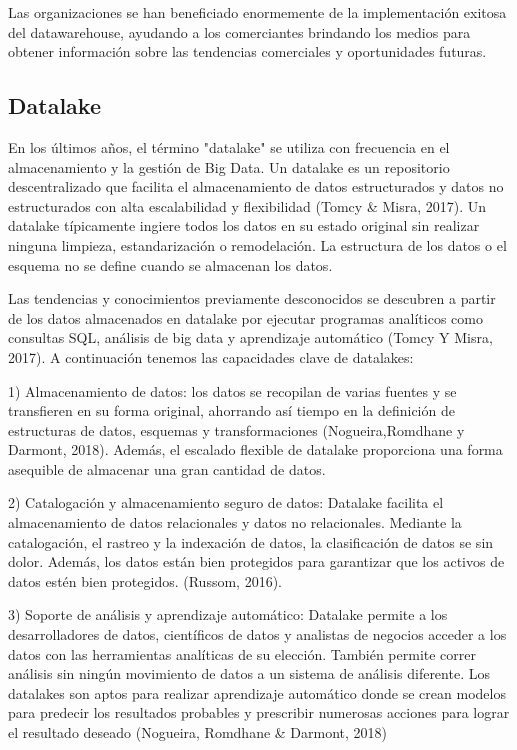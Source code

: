 \documentclass{article}
\begin{document}
\begin{multicols}{2}
Las organizaciones se han beneficiado enormemente de la implementación exitosa del datawarehouse, ayudando a los comerciantes brindando los medios para obtener información sobre las tendencias comerciales y oportunidades futuras. 

\subsection{Datalake}

En los últimos años, el término "datalake" se utiliza con frecuencia en el almacenamiento y la gestión de
Big Data. Un datalake es un repositorio descentralizado que facilita el almacenamiento de datos estructurados y datos no estructurados con alta escalabilidad y flexibilidad (Tomcy \& Misra, 2017). Un datalake típicamente ingiere todos los datos en su estado original sin realizar ninguna limpieza, estandarización o remodelación. La estructura de los datos o el esquema no se define cuando se almacenan los datos.

Las tendencias y conocimientos previamente desconocidos se descubren a partir de los datos almacenados en datalake por ejecutar programas analíticos como consultas SQL, análisis de big data y aprendizaje automático (Tomcy Y Misra, 2017). A continuación tenemos las capacidades clave de datalakes:

1) Almacenamiento de datos: los datos se recopilan de varias fuentes y se transfieren en su forma original, ahorrando así tiempo en la definición de estructuras de datos, esquemas y transformaciones (Nogueira,Romdhane y Darmont, 2018). 
Además, el escalado flexible de datalake proporciona una forma asequible de almacenar una gran cantidad de datos.      

2) Catalogación y almacenamiento seguro de datos: Datalake facilita el almacenamiento de datos relacionales y datos no relacionales. Mediante la catalogación, el rastreo y la indexación de datos, la clasificación de datos se sin dolor. Además, los datos están bien protegidos para garantizar que los activos de datos estén bien protegidos. (Russom, 2016).

3) Soporte de análisis y aprendizaje automático: Datalake permite a los desarrolladores de datos, científicos de datos y
analistas de negocios acceder a los datos con las herramientas analíticas de su elección. También permite correr análisis sin ningún movimiento de datos a un sistema de análisis diferente. Los datalakes son aptos para realizar aprendizaje automático donde se crean modelos para predecir los resultados probables y prescribir numerosas acciones para lograr el resultado deseado (Nogueira, Romdhane \& Darmont, 2018)



\end{multicols}
\end{document}
